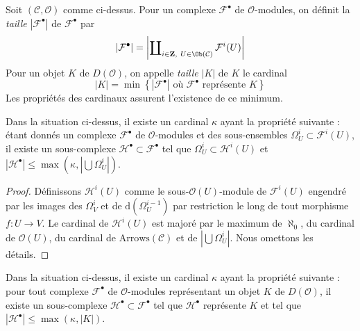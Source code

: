\noindent
Soit $(\mathcal{C}, \mathcal{O})$ comme ci-dessus. Pour un complexe
$\mathcal{F}^\bullet$ de $\mathcal{O}$-modules, on définit la
{\it taille} $|\mathcal{F}^\bullet|$ de $\mathcal{F}^\bullet$ par
$$
|\mathcal{F}^\bullet| =
\left|
\coprod\nolimits_{i \in \mathbf{Z},\ U \in \Ob(\mathcal{C})} \mathcal{F}^i(U)
\right|
$$
Pour un objet $K$ de $D(\mathcal{O})$, on appelle {\it taille} $|K|$ de $K$
le cardinal
$$
|K| = \min
\left\{
\left|
\mathcal{F}^\bullet
\right|
\text{ où }\mathcal{F}^\bullet\text{ représente }K
\right\}
$$
Les propriétés des cardinaux assurent l'existence de ce minimum.

\begin{lemma}
\label{lemma-build-from}
Dans la situation ci-dessus, il existe un cardinal $\kappa$ ayant la
propriété suivante : étant donnés un complexe $\mathcal{F}^\bullet$ de
$\mathcal{O}$-modules et des sous-ensembles
$\Omega^i_U \subset \mathcal{F}^i(U)$, il existe un sous-complexe
$\mathcal{H}^\bullet \subset \mathcal{F}^\bullet$ tel que
$\Omega^i_U \subset \mathcal{H}^i(U)$ et
$|\mathcal{H}^\bullet| \leq \max(\kappa, |\bigcup \Omega^i_U|)$.
\end{lemma}

\begin{proof}
Définissons $\mathcal{H}^i(U)$ comme le sous-$\mathcal{O}(U)$-module de
$\mathcal{F}^i(U)$ engendré par les images des $\Omega^i_V$ et de
$\text{d}(\Omega^{i - 1}_U)$ par restriction le long de tout morphisme
$f : U \to V$. Le cardinal de $\mathcal{H}^i(U)$ est majoré par
le maximum de $\aleph_0$, du cardinal de $\mathcal{O}(U)$, du cardinal de
$\text{Arrows}(\mathcal{C})$ et de $|\bigcup \Omega^i_U|$. Nous omettons les
détails.
\end{proof}

\begin{lemma}
\label{lemma-qis-small}
Dans la situation ci-dessus, il existe un cardinal $\kappa$ ayant la
propriété suivante : pour tout complexe $\mathcal{F}^\bullet$ de
$\mathcal{O}$-modules représentant un objet $K$ de $D(\mathcal{O})$, il existe
un sous-complexe $\mathcal{H}^\bullet \subset \mathcal{F}^\bullet$ tel que
$\mathcal{H}^\bullet$ représente $K$ et tel que
$|\mathcal{H}^\bullet| \leq \max(\kappa, |K|)$.
\end{lemma}

